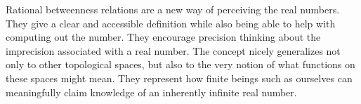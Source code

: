 \documentclass[12pt]{article}
\begin{document}
Rational betweenness relations are a new way of perceiving the real numbers. They give a clear and accessible definition while also being able to help with computing out the number. They encourage precision thinking about the imprecision associated with a real number. The concept nicely generalizes not only to other topological spaces, but also to the very notion of what functions on these spaces might mean. They represent how finite beings such as ourselves can meaningfully claim knowledge of an inherently infinite real number. 


\medskip

\normalem %
\printbibliography
\end{document}
